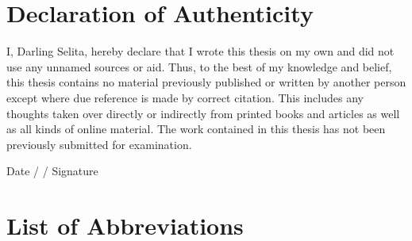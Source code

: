 \documentclass[12pt,a4paper]{report}
\begin{document}
\chapter*{Declaration of Authenticity}

I, Darling Selita, hereby declare that I wrote this thesis on my own and did not use any unnamed
sources or aid. Thus, to the best of my knowledge and belief, this thesis contains no material
previously published or written by another person except where due reference is made by correct
citation. This includes any thoughts taken over directly or indirectly from printed books and
articles as well as all kinds of online material. The work contained in this thesis has not been
previously submitted for examination.

\vspace{3cm}
\noindent Date \underline{\hspace{0.5cm}} / \underline{\hspace{0.5cm}} /
\underline{\hspace{1cm}} \hfill Signature \underline{\hspace{5cm}}

\chapter*{List of Abbreviations}
\end{document}
